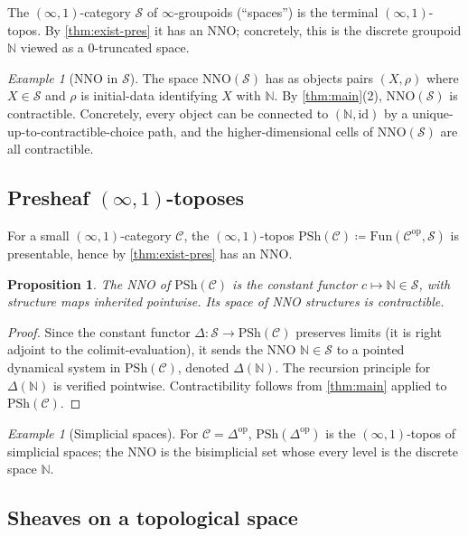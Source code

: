 \documentclass[12pt]{article}
\newtheorem{proposition}[theorem]{Proposition}
\theoremstyle{definition}
\theoremstyle{remark}
\newtheorem{example}[theorem]{Example}
\newcommand{\N}{\mathbb{N}}
\newcommand{\op}{\mathrm{op}}
\newcommand{\Spc}{\mathcal{S}}
\begin{document}
The $(\infty,1)$-category $\Spc$ of $\infty$-groupoids (``spaces'') is the terminal $(\infty,1)$-topos. By \cref{thm:exist-pres} it has an NNO; concretely, this is the discrete groupoid $\N$ viewed as a $0$-truncated space.

\begin{example}[NNO in $\Spc$]
The space $\mathrm{NNO}(\Spc)$ has as objects pairs $(X,\rho)$ where $X\in\Spc$ and $\rho$ is initial-data identifying $X$ with $\N$. By \cref{thm:main}(2), $\mathrm{NNO}(\Spc)$ is contractible. Concretely, every object can be connected to $(\N,\mathrm{id})$ by a unique-up-to-contractible-choice path, and the higher-dimensional cells of $\mathrm{NNO}(\Spc)$ are all contractible.
\end{example}

\subsection{Presheaf \texorpdfstring{$(\infty,1)$}{(infinity,1)}-toposes}

For a small $(\infty,1)$-category $\mathcal{C}$, the $(\infty,1)$-topos $\mathrm{PSh}(\mathcal{C})\coloneqq\mathrm{Fun}(\mathcal{C}^{\op},\Spc)$ is presentable, hence by \cref{thm:exist-pres} has an NNO\@.

\begin{proposition}\label{prop:psh-nno}
The NNO of $\mathrm{PSh}(\mathcal{C})$ is the constant functor $c\mapsto\N\in\Spc$, with structure maps inherited pointwise. Its space of NNO structures is contractible.
\end{proposition}

\begin{proof}
Since the constant functor $\Delta\colon\Spc\to\mathrm{PSh}(\mathcal{C})$ preserves limits (it is right adjoint to the colimit-evaluation), it sends the NNO $\N\in\Spc$ to a pointed dynamical system in $\mathrm{PSh}(\mathcal{C})$, denoted $\Delta(\N)$. The recursion principle for $\Delta(\N)$ is verified pointwise. Contractibility follows from \cref{thm:main} applied to $\mathrm{PSh}(\mathcal{C})$.
\end{proof}

\begin{example}[Simplicial spaces]
For $\mathcal{C}=\Delta^{\op}$, $\mathrm{PSh}(\Delta^{\op})$ is the $(\infty,1)$-topos of simplicial spaces; the NNO is the bisimplicial set whose every level is the discrete space $\N$.
\end{example}

\subsection{Sheaves on a topological space}
\end{document}
